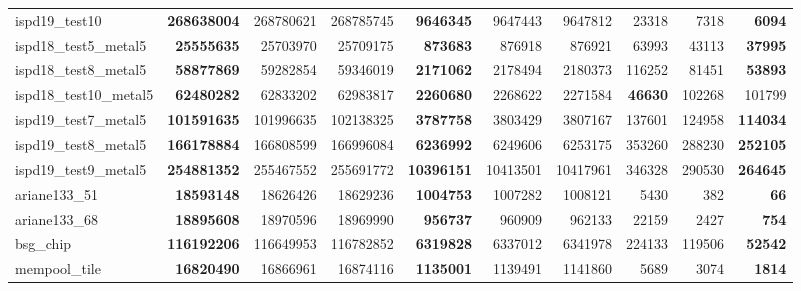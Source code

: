 \begin{table}[!htbp]
{\begin{tabular}{l rrr rrr rrr}
            ispd19\_test10         & \textbf{268638004} & 268780621         & 268785745        & \textbf{9646345} & 9647443           & 9647812          & 23318          & 7318            & \textbf{6094} \\
            ispd18\_test5\_metal5 & \textbf{25555635} & 25703970          & 25709175         & \textbf{873683}  & 876918            & 876921           & 63993          & 43113           & \textbf{37995} \\
            ispd18\_test8\_metal5 & \textbf{58877869} & 59282854          & 59346019         & \textbf{2171062} & 2178494           & 2180373          & 116252         & 81451           & \textbf{53893} \\
            ispd18\_test10\_metal5 & \textbf{62480282} & 62833202          & 62983817         & \textbf{2260680} & 2268622           & 2271584          & \textbf{46630}  & 102268          & 101799         \\
            ispd19\_test7\_metal5 & \textbf{101591635} & 101996635         & 102138325        & \textbf{3787758} & 3803429           & 3807167          & 137601         & 124958          & \textbf{114034} \\
            ispd19\_test8\_metal5 & \textbf{166178884} & 166808599         & 166996084        & \textbf{6236992} & 6249606           & 6253175          & 353260         & 288230          & \textbf{252105} \\
            ispd19\_test9\_metal5 & \textbf{254881352} & 255467552         & 255691772        & \textbf{10396151} & 10413501          & 10417961         & 346328         & 290530          & \textbf{264645} \\
            ariane133\_51          & \textbf{18593148} & 18626426          & 18629236         & \textbf{1004753} & 1007282           & 1008121          & 5430           & 382             & \textbf{66}   \\
            ariane133\_68          & \textbf{18895608} & 18970596          & 18969990         & \textbf{956737}  & 960909            & 962133           & 22159          & 2427            & \textbf{754}  \\
            bsg\_chip              & \textbf{116192206} & 116649953         & 116782852        & \textbf{6319828} & 6337012           & 6341978          & 224133         & 119506          & \textbf{52542} \\
            mempool\_tile          & \textbf{16820490} & 16866961          & 16874116         & \textbf{1135001} & 1139491           & 1141860          & 5689           & 3074            & \textbf{1814} \\

\end{tabular}}
\end{table}

